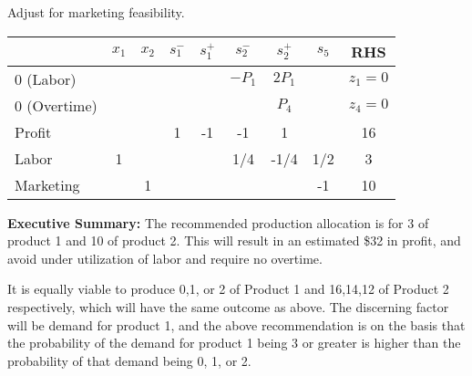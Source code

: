 \documentclass[answers]{exam}
\begin{document}
\begin{questions}
\begin{solution}
\begin{parts}
	Adjust for marketing feasibility.
	
	\begin{tabular}{lcccccccc}
		\hline
		& $x_1$ & $x_2$ & $s_1^-$ & $s_1^+$ & $s_2^-$ & $s_2^+$ & $s_5$ & RHS     \\ \hline
		0 (Labor)    &       &       &         &         & $-P_1$  & $2P_1$  &       & $z_1=0$ \\
		0 (Overtime) &       &       &         &         &         & $P_4$   &       & $z_4=0$ \\
		Profit       &       &       & 1       & -1      & -1      & 1       &       & 16      \\
		Labor        & 1     &       &         &         & 1/4     & -1/4    & 1/2   & 3       \\
		Marketing    &       & 1     &         &         &         &         & -1    & 10     
	\end{tabular}


	\textbf{Executive Summary:} 
	The recommended production allocation is for 
	3 of product 1 and 10 of product 2.
	This will result in an estimated \$32 in profit,
	and avoid under utilization of labor 
	and require no overtime.
	
	It is equally viable to produce 
	0,1, or 2 of Product 1 and 
	16,14,12 of Product 2 respectively,
	which will have the same outcome as above.
	The discerning factor will be demand for product 1,
	and the above recommendation is on the basis that the probability of
	the demand for product 1 being 3 or greater is higher than the probability
	of that demand being 0, 1, or 2.

\end{parts}
\end{solution}


\question
{}
\end{questions}
\end{document}
